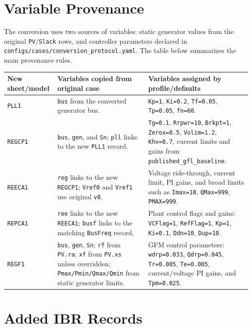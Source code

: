 \documentclass[10pt,letterpaper]{article}
\begin{document}
\section{Variable Provenance}

The conversion uses two sources of variables: static generator values from the
original \texttt{PV}/\texttt{Slack} rows, and controller parameters declared in
\texttt{configs/cases/conversion\_protocol.yaml}. The table below summarizes
the main provenance rules.

\begin{longtable}{p{2.7cm}p{4.5cm}p{6.1cm}}
\toprule
New sheet/model & Variables copied from original case & Variables assigned by profile/defaults \\
\midrule
\endhead
\texttt{PLL1} &
\texttt{bus} from the converted generator bus. &
\texttt{Kp=1}, \texttt{Ki=0.2}, \texttt{Tf=0.05}, \texttt{Tp=0.05}, \texttt{fn=60}. \\
\texttt{REGCP1} &
\texttt{bus}, \texttt{gen}, and \texttt{Sn}; \texttt{pll} links to the new \texttt{PLL1} record. &
\texttt{Tg=0.1}, \texttt{Rrpwr=10}, \texttt{Brkpt=1}, \texttt{Zerox=0.5}, \texttt{Volim=1.2}, \texttt{Khv=0.7}, current limits and gains from \texttt{published\_gfl\_baseline}. \\
\texttt{REECA1} &
\texttt{reg} links to the new \texttt{REGCP1}; \texttt{Vref0} and \texttt{Vref1} use original \texttt{v0}. &
Voltage ride-through, current limit, PI gains, and broad limits such as \texttt{Imax=10}, \texttt{QMax=999}, \texttt{PMAX=999}. \\
\texttt{REPCA1} &
\texttt{ree} links to the new \texttt{REECA1}; \texttt{busf} links to the matching \texttt{BusFreq} record. &
Plant control flags and gains: \texttt{VCFlag=1}, \texttt{RefFlag=1}, \texttt{Kp=1}, \texttt{Ki=0.1}, \texttt{Ddn=10}, \texttt{Dup=10}. \\
\texttt{REGF1} &
\texttt{bus}, \texttt{gen}, \texttt{Sn}; \texttt{rf} from \texttt{PV.ra}; \texttt{xf} from \texttt{PV.xs} unless overridden; \texttt{Pmax/Pmin/Qmax/Qmin} from static generator limits. &
GFM control parameters: \texttt{wdrp=0.033}, \texttt{Qdrp=0.045}, \texttt{Tr=0.005}, \texttt{Te=0.005}, current/voltage PI gains, and \texttt{Tpm=0.025}. \\
\bottomrule
\end{longtable}

\section{Added IBR Records}
\end{document}
